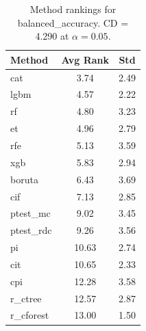 \begin{table}[h]
\centering
\caption{Method rankings for balanced_accuracy. CD = 4.290 at $\alpha=0.05$.}
\label{tab:ranks_balanced_accuracy}
\begin{tabular}{lcc}
\toprule
Method & Avg Rank & Std \\
\midrule
cat & 3.74 & 2.49 \\
lgbm & 4.57 & 2.22 \\
rf & 4.80 & 3.23 \\
et & 4.96 & 2.79 \\
rfe & 5.13 & 3.59 \\
xgb & 5.83 & 2.94 \\
boruta & 6.43 & 3.69 \\
cif & 7.13 & 2.85 \\
ptest_mc & 9.02 & 3.45 \\
ptest_rdc & 9.26 & 3.56 \\
pi & 10.63 & 2.74 \\
cit & 10.65 & 2.33 \\
cpi & 12.28 & 3.58 \\
r_ctree & 12.57 & 2.87 \\
r_cforest & 13.00 & 1.50 \\
\bottomrule
\end{tabular}
\end{table}